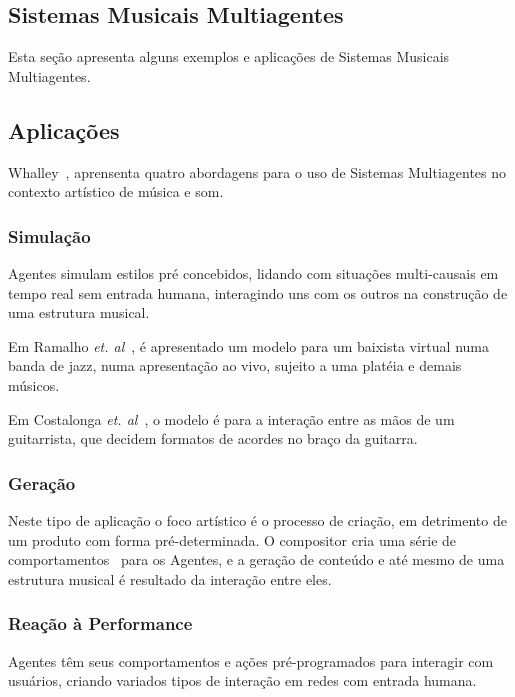 \documentclass[a4paper, 11pt, twoside]{article}
\begin{document}
\begin{multicols}{2}

\section{Sistemas Musicais Multiagentes}

Esta seção apresenta alguns exemplos e aplicações de Sistemas Musicais 
Multiagentes.

\subsection{Aplicações}

Whalley~\cite{whalley05}, aprensenta quatro abordagens para o uso de 
Sistemas Multiagentes no contexto artístico de música e som.

\subsubsection{Simulação}

Agentes simulam estilos pré concebidos, lidando com situações multi-causais em 
tempo real sem entrada humana, interagindo uns com os outros na construção de 
uma estrutura musical. 
  
Em Ramalho \textit{et. al}~\cite{ramalho99}, é apresentado um modelo para um 
baixista virtual numa banda de jazz, numa apresentação ao vivo, sujeito a uma 
platéia e demais músicos. 
  
Em Costalonga \textit{et. al}~\cite{costalonga08}, o modelo é para a interação 
entre as mãos de um guitarrista, que decidem formatos de acordes no braço da 
guitarra.

\subsubsection{Geração} 

Neste tipo de aplicação o foco artístico é o processo de criação, em 
detrimento de um produto com forma pré-determinada. O compositor cria uma 
série de comportamentos~\cite{miranda03} para os Agentes, e a geração de 
conteúdo e até mesmo de uma estrutura musical é resultado da interação 
entre eles.

\subsubsection{Reação à Performance}

Agentes têm seus comportamentos e ações pré-programados para interagir com 
usuários, criando variados tipos de interação em redes com entrada humana.


\end{multicols}
\end{document}
